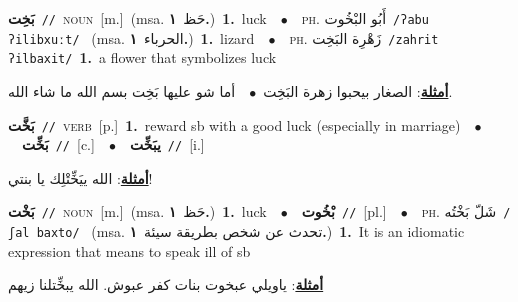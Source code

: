 \documentclass[10pt,a4paper,twoside]{article} %
\begin{document}
\begin{multicols}{2}
{\setlength\topsep{0pt}\textbf{\foreignlanguage{arabic}{بَخِت}}\ {\color{gray}\texttt{//}\color{black}}\ \textsc{noun}\ [m.]\ \color{gray}(msa. \foreignlanguage{arabic}{حَظ}~\foreignlanguage{arabic}{\textbf{١.}})\color{black}\ \textbf{1.}~luck\ \ $\bullet$\ \ \textsc{ph.} \color{gray} \foreignlanguage{arabic}{أَبُو البْخُوت}\color{black}\ {\color{gray}\texttt{/{\sffamily ʔabu ʔilibxuːt}/}\color{black}}\ \color{gray} (msa. \foreignlanguage{arabic}{الحرباء}~\foreignlanguage{arabic}{\textbf{١.}})\color{black}\ \textbf{1.}~lizard\ \ $\bullet$\ \ \textsc{ph.} \color{gray} \foreignlanguage{arabic}{زَهْرِة البَخِت}\color{black}\ {\color{gray}\texttt{/{\sffamily zahrit ʔilbaxit}/}\color{black}}\ \textbf{1.}~a flower that symbolizes luck\  \begin{flushright}\color{gray}\foreignlanguage{arabic}{\textbf{\underline{\foreignlanguage{arabic}{أمثلة}}}: الصغار بيحبوا زهرة البَخِت\ $\bullet$\ \  أما شو عليها بَخِت بسم الله ما شاء الله.}\end{flushright}\color{black}} \vspace{2mm}

{\setlength\topsep{0pt}\textbf{\foreignlanguage{arabic}{بَخَّت}}\ {\color{gray}\texttt{//}\color{black}}\ \textsc{verb}\ [p.]\ \textbf{1.}~reward sb with a good luck (especially in marriage)\ \ $\bullet$\ \ \setlength\topsep{0pt}\textbf{\foreignlanguage{arabic}{بَخِّت}}\ {\color{gray}\texttt{//}\color{black}}\ [c.]\ \ $\bullet$\ \ \setlength\topsep{0pt}\textbf{\foreignlanguage{arabic}{يبَخِّت}}\ {\color{gray}\texttt{//}\color{black}}\ [i.]\  \begin{flushright}\color{gray}\foreignlanguage{arabic}{\textbf{\underline{\foreignlanguage{arabic}{أمثلة}}}: الله ييَخِّتْلِك يا بنتي!}\end{flushright}\color{black}} \vspace{2mm}

{\setlength\topsep{0pt}\textbf{\foreignlanguage{arabic}{بَخْت}}\ {\color{gray}\texttt{//}\color{black}}\ \textsc{noun}\ [m.]\ \color{gray}(msa. \foreignlanguage{arabic}{حَظ}~\foreignlanguage{arabic}{\textbf{١.}})\color{black}\ \textbf{1.}~luck\ \ $\bullet$\ \ \setlength\topsep{0pt}\textbf{\foreignlanguage{arabic}{بْخُوت}}\ {\color{gray}\texttt{//}\color{black}}\ [pl.]\ \ $\bullet$\ \ \textsc{ph.} \color{gray} \foreignlanguage{arabic}{شَلّ بَخْتُه}\color{black}\ {\color{gray}\texttt{/{\sffamily ʃal baxto}/}\color{black}}\ \color{gray} (msa. \foreignlanguage{arabic}{تحدث عن شخص بطريقة سيئة}~\foreignlanguage{arabic}{\textbf{١.}})\color{black}\ \textbf{1.}~It is an idiomatic expression that means to speak ill of sb\  \begin{flushright}\color{gray}\foreignlanguage{arabic}{\textbf{\underline{\foreignlanguage{arabic}{أمثلة}}}: ياويلي عبخوت بنات كفر عبوش. الله يبخِّتلنا زيهم}\end{flushright}\color{black}} \vspace{2mm}


\end{multicols}
\end{document}
